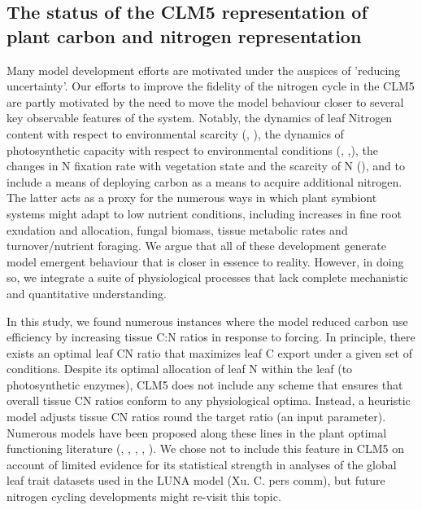 \documentclass[draft,linenumbers]{agujournal}
\begin{document}
\subsection{The status of the CLM5 representation of plant carbon and nitrogen representation}
Many model development efforts are motivated under the auspices of 'reducing uncertainty'.  Our efforts to improve the fidelity of the nitrogen cycle in the CLM5 are partly motivated by the need to move the model behaviour closer to several key observable features of the system. Notably, the dynamics of leaf Nitrogen content with respect to environmental scarcity (\cite{zaehle2014}, \cite{brzostek2014}), the dynamics of photosynthetic capacity with respect to environmental conditions (\cite{xu2012}, \cite{ali2016},\cite{rogers2017}), the changes in N fixation rate with vegetation state and the scarcity of N (\cite{vitousek2002}), and to include a means of deploying carbon as a means to acquire additional nitrogen. The latter acts as a proxy for the numerous ways in which plant symbiont systems might adapt to low nutrient conditions, including increases in fine root exudation and allocation, fungal biomass, tissue metabolic rates and turnover/nutrient foraging.  We argue that all of these development generate model emergent behaviour that is closer in essence to reality. However, in doing so, we integrate a suite of physiological processes that lack complete mechanistic and quantitative understanding.

In this study, we found numerous instances where the model reduced carbon use efficiency by increasing tissue C:N ratios in response to forcing. In principle, there exists an optimal leaf CN ratio that maximizes leaf C export under a given set of conditions. Despite its optimal allocation of leaf N within the leaf (to photosynthetic enzymes), CLM5 does not include any scheme that ensures that overall tissue CN ratios conform to any physiological optima. Instead, a heuristic model adjusts tissue CN ratios round the target ratio (an input parameter).  Numerous models have been proposed along these lines in the plant optimal functioning literature (\cite{vanwijk2003}, \cite{mcmurtrie2011}, \cite{a,nten2011} \cite{franklin2012}, \cite{mcmurtrie2013}, \cite{thomas2014}). We chose not to include this feature in CLM5 on account of limited evidence for its statistical strength in analyses of the global leaf trait datasets used in the LUNA model (Xu. C. pers comm), but future nitrogen cycling developments might re-visit this topic. 
\end{document}
